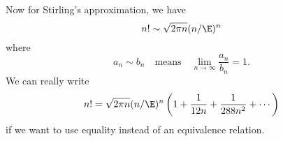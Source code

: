 Now for Stirling's approximation, we have
\begin{equation}
n!\sim\sqrt{2\pi n}(n/\E)^{n}
\end{equation}
where
\begin{equation}
a_{n}\sim b_{n}\quad\mbox{means}\quad
\lim_{n\to\infty}\frac{a_{n}}{b_{n}}=1.
\end{equation}
We can really write
\begin{equation}
n!=\sqrt{2\pi n}(n/\E)^{n}\left(1+\frac{1}{12n}+\frac{1}{288n^{2}}+\cdots\right)
\end{equation}
if we want to use equality instead of an equivalence relation.

